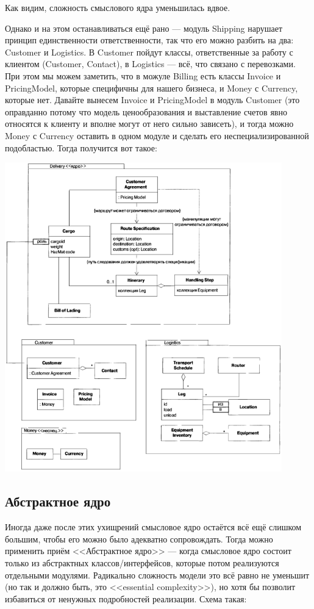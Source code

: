 \documentclass{../../text-style}
\begin{document}
Как видим, сложность смыслового ядра уменьшилась вдвое.

Однако и на этом останавливаться ещё рано --- модуль Shipping нарушает принцип единственности ответственности, так что его можно разбить на два: Customer и Logistics. В Customer пойдут классы, ответственные за работу с клиентом (Customer, Contact), в Logistics --- всё, что связано с перевозками. При этом мы можем заметить, что в можуле Billing есть классы Invoice и PricingModel, которые специфичны для нашего бизнеса, и Money с Currency, которые нет. Давайте вынесем Invoice и PricingModel в модуль Customer (это оправданно потому что модель ценообразования и выставление счетов явно относятся к клиенту и вполне могут от него сильно зависеть), и тогда можно Money с Currency оставить в одном модуле и сделать его неспециализированной подобластью. Тогда получится вот такое:

\begin{center}
    \includegraphics[width=0.9\textwidth]{shippingRepacked.png}
\end{center}

\subsection{Абстрактное ядро}

Иногда даже после этих ухищрений смысловое ядро остаётся всё ещё слишком большим, чтобы его можно было адекватно сопровождать. Тогда можно применить приём <<Абстрактное ядро>> --- когда смысловое ядро состоит только из абстрактных классов/интерфейсов, которые потом реализуются отдельными модулями. Радикально сложность модели это всё равно не уменьшит (но так и должно быть, это <<essential complexity>>), но хотя бы позволит избавиться от ненужных подробностей реализации. Схема такая:
\end{document}
